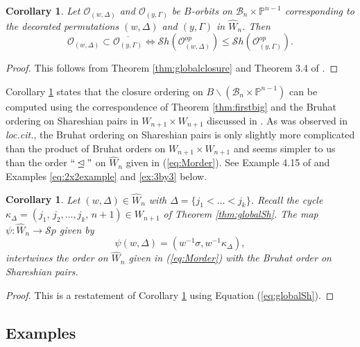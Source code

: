 \documentclass[12pt]{amsart}
\numberwithin{equation}{section}
\newtheorem{cor}[thm]{Corollary}
\newcommand{\cW}{{ W}}
\newcommand{\B}{\mathcal{B}}
\newcommand{\Sh}{\mathcal{S}h}
\newcommand{\Sp}{\mathcal{S}p}
\begin{document}
\begin{cor}\label{c:canuseSh}
Let $\mathcal{O}_{(w,\Delta)}$ and $\mathcal{O}_{(y,\Gamma)}$ be $B$-orbits on 
$\B_{n}\times\mathbb{P}^{n-1}$ corresponding to the decorated permutations $(w,\Delta)$ and $(y,\Gamma)$ in $\widehat{\cW}_{n}$.   Then 
$$
\mathcal{O}_{(w,\Delta)}\subset\overline{\mathcal{O}_{(y,\Gamma)}}\Leftrightarrow \Sh(\mathcal{O}^{op}_{(w,\Delta)})\leq \Sh(\mathcal{O}_{(y,\Gamma)}^{op}).
$$
\end{cor}

\begin{proof}
This follows from Theorem \ref{thm:globalclosure} and Theorem 3.4 of \cite{Shpairs}.

\end{proof}
Corollary \ref{c:canuseSh} states that the closure ordering on 
$B\backslash (\B_{n}\times\mathbb{P}^{n-1})$ can be computed using the correspondence of Theorem \ref{thm:firstbig} and the Bruhat ordering on Shareshian pairs in $\cW_{n+1} \times \cW_{n+1}$ discussed in \cite{Shpairs}.  As was observed in \emph{loc.cit.}, the Bruhat ordering on Shareshian pairs is only slightly more complicated than the product of Bruhat orders on $\cW_{n+1}\times\cW_{n+1}$ and seems  simpler to us than the order $``\unlhd"$ on $\widehat{W}_{n}$ given in (\ref{eq:Morder}).  See Example 4.15 of \cite{Shpairs} and Examples \ref{eq:2x2example} and  \ref{ex:3by3} below.


\begin{cor}
Let $(w,\Delta)\in\widehat{\cW}_{n}$ with $\Delta=\{j_{1}<\dots<j_{k}\}$.  Recall the cycle $\kappa_{\Delta}=(j_{1},\, j_{2},\dots, j_{k},\, n+1)\in\cW_{n+1}$ of Theorem \ref{thm:globalSh}.  The map $\psi: \widehat{\cW}_{n}\to \Sp$ given by 
$$
\psi(w,\Delta)=(w^{-1}\sigma, w^{-1}\kappa_{\Delta}),
$$
intertwines the order on $\widehat{\cW}_{n}$ given in (\ref{eq:Morder}) with the Bruhat order on Shareshian pairs.
\end{cor}
\begin{proof}
This is a restatement of Corollary \ref{c:canuseSh} using Equation (\ref{eq:globalSh}).
\end{proof}


\subsection{Examples}
\end{document}
